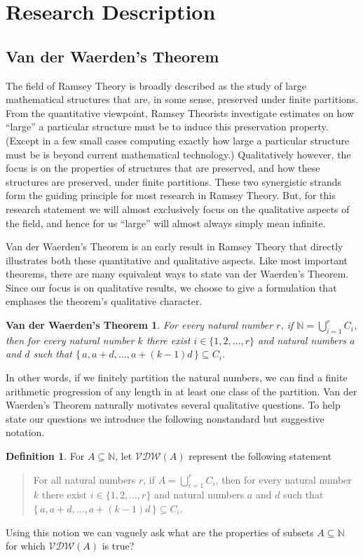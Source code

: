 \documentclass[12pt]{article}
\theoremstyle{plain}
\newtheorem{vdw}[thm]{Van der Waerden's Theorem}
\theoremstyle{definition}
\newtheorem{defn}[thm]{Definition}
\newcommand{\bbN}{\mathbb{N}}
\newcommand{\VDW}{\mathcal{VDW}}
\begin{document}
\section{Research Description}
\subsection{Van der Waerden's Theorem}
The field of Ramsey Theory is broadly described as the study of large
mathematical structures that are, in some sense, preserved under
finite partitions.
From the quantitative viewpoint, Ramsey Theorists investigate
estimates on how ``large'' a particular structure must be to induce
this preservation property.
(Except in a few small cases computing exactly how large a particular
structure must be is beyond current mathematical technology.)
Qualitatively however, the focus is on the properties of structures that are preserved, and how these structures are preserved, under finite partitions.
These two synergistic strands form the guiding principle for most
research in Ramsey Theory.
But, for this research statement we will almost exclusively focus on
the qualitative aspects of the field, and hence for us ``large'' will
almost always simply mean infinite.


Van der Waerden's Theorem is an early\cite{Van-der-Waerden:1927fk}
result in Ramsey Theory that directly illustrates both these
quantitative and qualitative aspects.
Like most important theorems, there are many equivalent ways to state
van der Waerden's Theorem.
Since our focus is on qualitative results, we choose to give a
formulation that emphases the theorem's qualitative character. 
  \begin{vdw}
    For every natural number $r$, if\/ $\bbN = \bigcup_{i=1}^r C_i$,
    then for every natural number $k$ there exist $i \in \{1, 2,
    \ldots, r\}$ and natural numbers $a$ and $d$ such that $\{\, a,
    a+d, \ldots, a+(k-1)d\,\} \subseteq C_i$.
  \end{vdw}
In other words, if we finitely partition the natural numbers, we can
find a finite arithmetic progression of any length in at least one
class of the partition. 
Van der Waerden's Theorem naturally motivates several
qualitative questions. 
To help state our questions we introduce
the following nonstandard but suggestive notation.
  \begin{defn}
    For $A \subseteq \bbN$, let $\VDW(A)$ represent the
    following statement
      \begin{quote}
      For all natural numbers $r$, if $A = \bigcup_{i=1}^r C_i$, then
      for every natural number $k$ there exist $i \in \{1, 2,
      \ldots, r\}$ and natural numbers $a$ and $d$ such that $\{\, a,
      a+d, \ldots, a+(k-1)d\,\} \subseteq C_i$.
     \end{quote}
  \end{defn}
Using this notion we can vaguely ask what are the properties of
subsets $A \subseteq \bbN$ for which $\VDW(A)$ is true?



\end{document}
